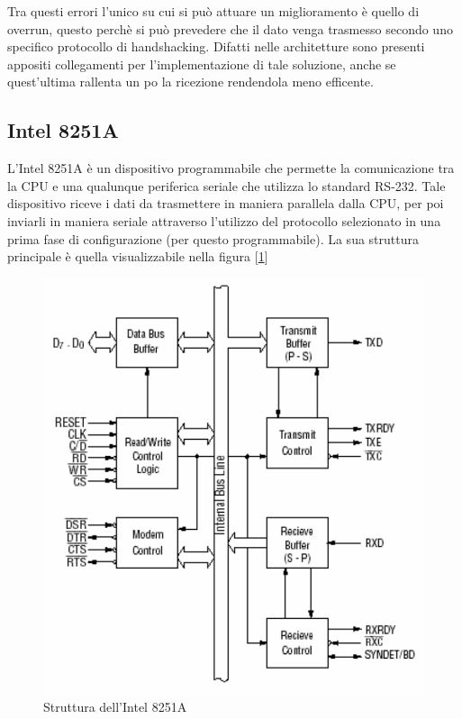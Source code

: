 Tra questi errori l'unico su cui si può attuare un miglioramento è quello di overrun, questo perchè si può prevedere che il dato venga trasmesso secondo uno specifico protocollo di handshacking. Difatti nelle architetture sono presenti appositi collegamenti per l'implementazione di tale soluzione, anche se quest'ultima rallenta un po la ricezione rendendola meno efficente.

\subsection{Intel 8251A}\label{par:intel-8251A}
L'Intel 8251A è un dispositivo programmabile che permette la comunicazione tra la CPU e una qualunque periferica seriale che utilizza lo standard RS-232. Tale dispositivo riceve i dati da trasmettere in maniera parallela dalla CPU, per poi inviarli in maniera seriale attraverso l'utilizzo del protocollo selezionato in una prima fase di configurazione (per questo programmabile). 
La sua struttura principale è quella visualizzabile nella figura [\ref{img:Intel-8251A}]

\begin{figure}
    \centering
    \includegraphics[width=.5\textwidth]{img/Intel8251A.png}
    \caption{Struttura dell'Intel 8251A}\label{img:Intel-8251A}
\end{figure}

